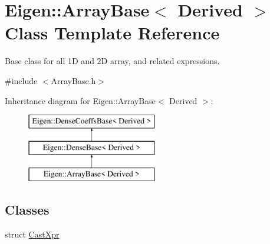 \hypertarget{class_eigen_1_1_array_base}{}\section{Eigen\+::Array\+Base$<$ Derived $>$ Class Template Reference}
\label{class_eigen_1_1_array_base}


Base class for all 1D and 2D array, and related expressions.  




{\ttfamily \#include $<$Array\+Base.\+h$>$}

Inheritance diagram for Eigen\+::Array\+Base$<$ Derived $>$\+:\begin{figure}[H]
\begin{center}
\leavevmode
\includegraphics[height=3.000000cm]{class_eigen_1_1_array_base}
\end{center}
\end{figure}
\subsection*{Classes}
\begin{DoxyCompactItemize}
\item 
struct \mbox{\hyperlink{struct_eigen_1_1_array_base_1_1_cast_xpr}{Cast\+Xpr}}
\end{DoxyCompactItemize}
